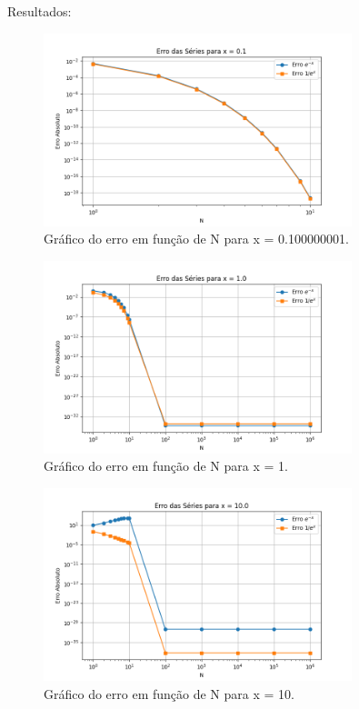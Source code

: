 \documentclass[12pt, a4paper]{article} %
\begin{document}
    Resultados:
    \begin{figure}[H]
        \centering
        \includegraphics[width=0.8\textwidth]{../images/erro_x_0_1.png}
        \caption{Gr\'afico do erro em fun\c{c}\~ao de N para x = 0.100000001.}
    \end{figure}

    \begin{figure}[H]
        \centering
        \includegraphics[width=0.8\textwidth]{../images/erro_x_1_0.png}
        \caption{Gr\'afico do erro em fun\c{c}\~ao de N para x = 1.}
    \end{figure}

    \begin{figure}[H]
        \centering
        \includegraphics[width=0.8\textwidth]{../images/erro_x_10_0.png}
        \caption{Gr\'afico do erro em fun\c{c}\~ao de N para x = 10.}
    \end{figure}
\end{document}
